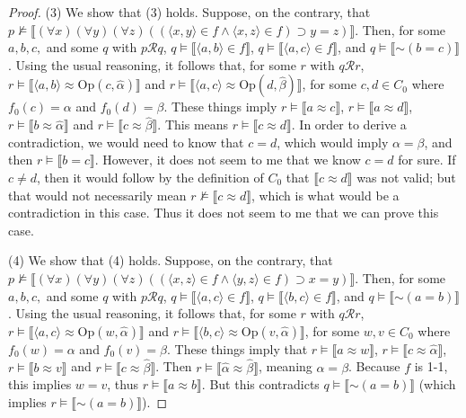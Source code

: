 \documentclass{article}
\newcommand*{\oldneg}{\mathord{\sim}}
\newcommand{\lbc}{\llbracket}
\newcommand{\rbc}{\rrbracket}
\theoremstyle{definition}
\begin{document}
\begin{proof}
(3) We show that (3) holds. Suppose, on the contrary, that 
$p\nvDash\lbc(\forall x)(\forall y)(\forall z)((\langle x,y\rangle\in f\wedge\langle x,z\rangle\in f)\supset y=z)\rbc$. 
Then, for some $a,b,c,$ and some $q$ with $p\mathcal{R}q$,
$q\vDash\lbc\langle a,b\rangle\in f\rbc$, $q\vDash\lbc\langle a,c\rangle\in f\rbc$, 
and $q\vDash\lbc\oldneg (b=c)\rbc$. Using the usual reasoning, it follows that, for some $r$ with $q\mathcal{R}r$,
$r\vDash\lbc\langle a,b\rangle\approx\textrm{Op}(c,\hat{\alpha})\rbc$ and 
$r\vDash\lbc\langle a,c\rangle\approx\textrm{Op}(d,\hat{\beta})\rbc$, for some 
$c,d\in C_0$ where $f_0(c)=\alpha$ and $f_0(d)=\beta$. These things imply 
$r\vDash\lbc a\approx c\rbc$, $r\vDash\lbc a\approx d\rbc$, $r\vDash\lbc b\approx\hat{\alpha}\rbc$
and $r\vDash\lbc c\approx\hat{\beta}\rbc$. This means 
$r\vDash\lbc c\approx d\rbc$. In order to derive a contradiction, we would need to know that 
$c=d$, which would imply $\alpha=\beta$, and then $r\vDash\lbc b=c\rbc$. However, it does not seem 
to me that we know $c=d$ for sure. If $c\ne d$, then it would follow by the 
definition of $C_0$ that $\lbc c\approx d\rbc$ was not valid; but that would not necessarily mean 
$r\nvDash\lbc c\approx d\rbc$, which is what would be a contradiction in this case. 
Thus it does not seem to me that we can prove this case.

(4) We show that (4) holds. Suppose, on the contrary, that 
$p\nvDash\lbc(\forall x)(\forall y)(\forall z)((\langle x,z\rangle\in f\wedge\langle y,z\rangle\in f)\supset x=y)\rbc$. Then, 
for some $a,b,c,$ and some $q$ with $p\mathcal{R}q$,
$q\vDash\lbc\langle a,c\rangle\in f\rbc$, $q\vDash\lbc\langle b,c\rangle\in f\rbc$, 
and $q\vDash\lbc\oldneg(a=b)\rbc$. Using the usual reasoning, it follows that, for some $r$ with 
$q\mathcal{R}r$, $r\vDash\lbc\langle a,c\rangle\approx\textrm{Op}(w,\hat{\alpha})\rbc$ and 
$r\vDash\lbc\langle b,c\rangle\approx\textrm{Op}(v,\hat{\alpha})\rbc$, for some $w,v\in C_0$ where
$f_0(w)=\alpha$ and $f_0(v)=\beta$. These things imply that $r\vDash\lbc a\approx w\rbc$,
$r\vDash\lbc c\approx\hat{\alpha}\rbc$, $r\vDash\lbc b\approx v\rbc$ and 
$r\vDash\lbc c\approx\hat{\beta}\rbc$. Then 
$r\vDash\lbc\hat{\alpha}\approx\hat{\beta}\rbc$, meaning $\alpha=\beta$. Because $f$ is 1-1, 
this implies $w=v$, thus 
$r\vDash\lbc a\approx b\rbc$. But 
this contradicts $q\vDash\lbc\oldneg(a=b)\rbc$ (which implies 
$r\vDash\lbc\oldneg(a=b)\rbc$).

\end{proof}
\end{document}
